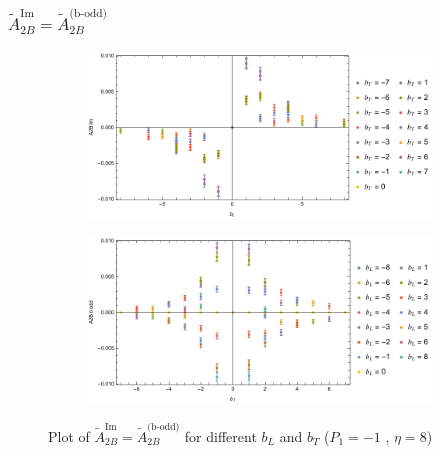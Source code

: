\documentclass[]{article}
\numberwithin{equation}{section}
\newcommand{\tAmp}{\widetilde{A}}
\newcommand{\tAmp}{\ensuremath{\widetilde{A}^{(+)}}}
\begin{document}
\subsubsection{$\tAmp^{\text{Im}}_{2B}=\tAmp^{\text{(b-odd)}}_{2B}$}
\begin{figure}[h!]
     \centering
     \begin{subfigure}[b]{0.45\textwidth}
         \centering
         \includegraphics[width=\textwidth]{Amp_plots/bL_A2B_b_odd_P1_-1_eta_8.pdf}
     \end{subfigure}
     \begin{subfigure}[b]{0.45\textwidth}
         \centering
         \includegraphics[width=\textwidth]{Amp_plots/bT_A2B_b_odd_P1_-1_eta_8.pdf}
     \end{subfigure}
        \caption{Plot of  $\tAmp^{\text{Im}}_{2B}=\tAmp^{\text{(b-odd)}}_{2B}$ for different $b_{L}$ and $b_{T}$  ($P_{1} = -1$ , $\eta=8$)}
\end{figure}
\end{document}
